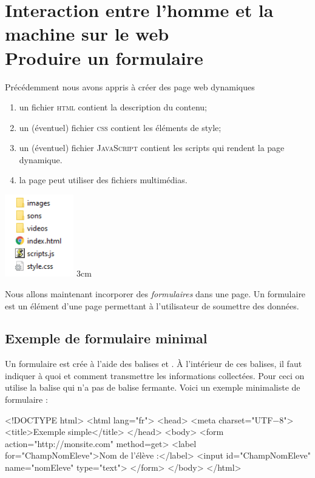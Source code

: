 \documentclass[a4paper,11pt]{book}
\begin{document}
\chapter*{\large Interaction entre l'homme et la machine sur le web \\[-1em]\fontsize{35pt}{42pt}\selectfont Produire un formulaire}
Précédemment nous avons appris à créer des page web dynamiques\\
\double
{
	\begin{enumerate}[--]
		\item 	un fichier \textsc{html} contient la description du contenu;
		\item 	un (éventuel) fichier \textsc{css} contient les éléments de style;
		\item 	un (éventuel) fichier \textsc{JavaScript} contient les scripts qui rendent la page dynamique.
		\item	la page peut utiliser des fichiers multimédias.
	\end{enumerate}
}
{
\includegraphics[width=3cm]{img/arborescence_site.png}
}{3cm}

Nous allons maintenant incorporer des \textit{formulaires} dans une page. Un formulaire est un élément d'une page permettant à l'utilisateur de soumettre des données.

\section*{Exemple de formulaire minimal}

Un formulaire est crée à l'aide des balises  et . À l'intérieur de ces balises, il faut indiquer à quoi et comment transmettre les informations collectées. Pour ceci on utilise la balise  qui n'a pas de balise fermante. Voici un exemple minimaliste de formulaire :

\begin{html}
<!DOCTYPE html>
<html lang="fr">
<head>
    <meta charset="UTF−8">
    <title>Exemple simple</title>
</head>
<body>
<form action="http://monsite.com" method=get>
    <label for="ChampNomEleve">Nom de l'élève :</label> 
    <input id="ChampNomEleve" name="nomEleve" type="text">
</form>
</body>
</html>
\end{html}
\end{document}
